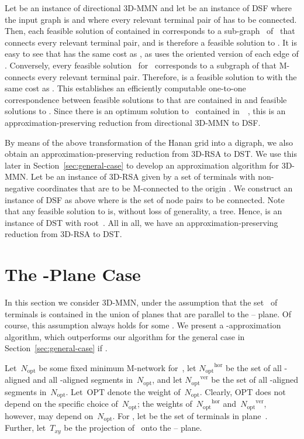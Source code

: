 \documentclass[11pt]{llncs}
\newcommand{\Nopt}{\ensuremath{N_\mathrm{opt}}\xspace}
\newcommand{\Nopthor}{\ensuremath{\Nopt^\mathrm{hor}}\xspace}
\newcommand{\Noptver}{\ensuremath{\Nopt^\mathrm{ver}}\xspace}
\newcommand{\Txy}{\ensuremath{T_{xy}}\xspace}
\newcommand{\opt}{\ensuremath{\mathrm{OPT}}\xspace}
\begin{document}
Let  be an instance of directional 3D-MMN and let  be an 
instance of DSF where the input graph is  and where every relevant
terminal pair of  has to be connected.  Then, each feasible solution 
of  contained in  corresponds to a sub-graph~ of~ that
connects every relevant terminal pair, and is therefore a 
feasible solution to .  It is easy to see that  has the same
cost as , 
as  uses the oriented version of each edge of .
Conversely, every feasible solution~ for~ corresponds to a
subgraph  of  that M-connects every relevant terminal pair.
Therefore,  is a feasible solution to  with the same cost as
.  This establishes an efficiently computable one-to-one
correspondence between feasible solutions to  that are contained in
 and feasible solutions to .  Since there is an optimum
solution to~ contained in~~\cite{gln-ammn-01}, this is an
approximation-preserving reduction from directional 3D-MMN to DSF.

By means of the above transformation of the Hanan grid into a digraph,
we also obtain an approximation-preserving reduction from 3D-RSA to
DST.  We use this later in
Section~\ref{sec:general-case} to develop an approximation algorithm
for 3D-MMN.  Let  be an instance of 3D-RSA given by a set  of
terminals with non-negative coordinates that are to be M-connected to
the origin .  We construct an instance  of DSF as above where
 is the set of node pairs to be connected.
Note that any feasible solution to  is, without loss of
generality, a tree.  Hence,  is an instance of DST with root~.
All in all, we have an approximation-preserving reduction from 3D-RSA
to DST. 

\section{The -Plane Case}
\label{sec:k-planes}

In this section we consider 3D-MMN, under the assumption that the
set~ of terminals is contained in the union of  planes
 that are parallel to the -- plane.  Of course,
this assumption always holds for some .  We present a
-approximation algorithm, which outperforms our algorithm for
the general case in Section~\ref{sec:general-case} if .  

Let~\Nopt be some fixed minimum M-network for~, let \Nopthor be the
set of all -aligned and all -aligned segments in~\Nopt, and let
\Noptver be the set of all -aligned segments in~\Nopt.  Let~\opt
denote the weight of~\Nopt.  Clearly, \opt does not depend on the
specific choice of~\Nopt; the weights of~\Nopthor and~\Noptver,
however, may depend on~\Nopt. For , let  be the set of terminals in plane~.  Further, let~\Txy
be the projection of~ onto the -- plane. 
\end{document}
